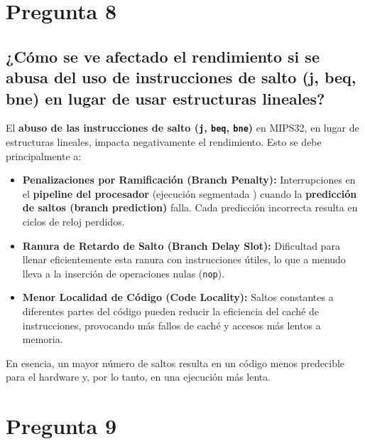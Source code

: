 \documentclass{article}
\begin{document}

\section*{Pregunta 8}

\subsection*{¿Cómo se ve afectado el rendimiento si se abusa del uso de instrucciones de salto (j, beq, 
bne) en lugar de usar estructuras lineales? }

\maketitle

El \textbf{abuso de las instrucciones de salto (\texttt{j}, \texttt{beq}, \texttt{bne})} en MIPS32, en lugar de estructuras lineales, impacta negativamente el rendimiento. Esto se debe principalmente a:

\begin{itemize}
    \item \textbf{Penalizaciones por Ramificación (Branch Penalty):} Interrupciones en el \textbf{pipeline del procesador} (ejecución segmentada ) cuando la \textbf{predicción de saltos (branch prediction)} falla. Cada predicción incorrecta resulta en ciclos de reloj perdidos.
    \item \textbf{Ranura de Retardo de Salto (Branch Delay Slot):} Dificultad para llenar eficientemente esta ranura con instrucciones útiles, lo que a menudo lleva a la inserción de operaciones nulas (\texttt{nop}).
    \item \textbf{Menor Localidad de Código (Code Locality):} Saltos constantes a diferentes partes del código pueden reducir la eficiencia del caché de instrucciones, provocando más fallos de caché y accesos más lentos a memoria.
\end{itemize}

En esencia, un mayor número de saltos resulta en un código menos predecible para el hardware y, por lo tanto, en una ejecución más lenta.


\section*{Pregunta 9}
\end{document}

